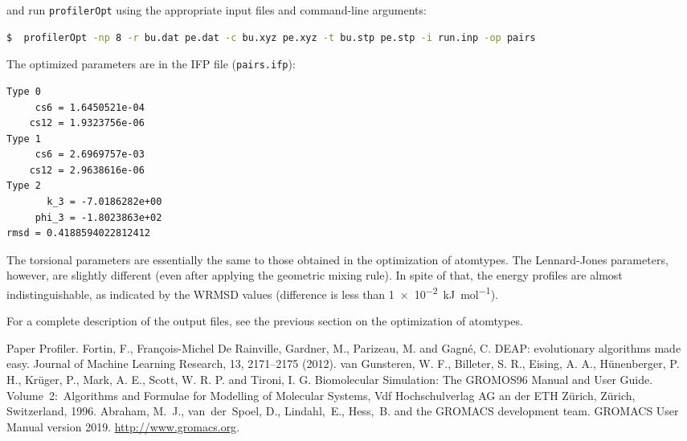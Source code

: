 \documentclass[10pt,a4paper,openany]{memoir}
\numberwithin{equation}{section}
\newcommand{\profileropt}[0]{\texttt{profilerOpt}}
\begin{document}
\noindent
and run \profileropt{} using the appropriate input files and 
command-line arguments:

\begin{lstlisting}[language=bash]
$  profilerOpt -np 8 -r bu.dat pe.dat -c bu.xyz pe.xyz -t bu.stp pe.stp -i run.inp -op pairs
\end{lstlisting}\vspace{2ex}\par

The optimized parameters are in the IFP file (\texttt{pairs.ifp}):

\begin{lstlisting}[language=gromacs]
Type 0
     cs6 = 1.6450521e-04     
    cs12 = 1.9323756e-06     
Type 1
     cs6 = 2.6969757e-03     
    cs12 = 2.9638616e-06     
Type 2
       k_3 = -7.0186282e+00    
     phi_3 = -1.8023863e+02    
rmsd = 0.4188594022812412
\end{lstlisting}\vspace{2ex}\par

\noindent
The torsional parameters are essentially the same to those obtained in
the optimization of atomtypes.  The Lennard-Jones parameters, however,
are slightly different (even after applying the geometric mixing
rule). In spite of that, the energy profiles are almost
indistinguishable, as indicated by the WRMSD values (difference is
less than \SI{1e-2}{\kJ\per\mole}).

For a complete description of the output files, see the previous section on the
optimization of atomtypes.

\begin{thebibliography}{9}
 Paper Profiler.
    Fortin, F., Fran\c{c}ois-Michel De Rainville, Gardner, M., Parizeau, M. and Gagn\'e, C. DEAP: evolutionary algorithms made easy. Journal of Machine Learning Research, 13, 2171–2175 (2012). 
 van Gunsteren, W. F., Billeter, S. R., Eising,
  A. A., Hünenberger, P. H., Krüger, P., Mark, A. E., Scott,
  W. R. P. and Tironi, I. G. Biomolecular Simulation: The GROMOS96
  Manual and User Guide. Volume~2:~Algorithms and Formulae for
  Modelling of Molecular Systems, Vdf Hochschulverlag AG an der ETH
  Zürich, Zürich, Switzerland, 1996.
 Abraham, M.~J., van~der~Spoel, D., Lindahl,~E.,
  Hess,~B. and the GROMACS development team. GROMACS User Manual
  version 2019. \url{http://www.gromacs.org}.
\end{thebibliography}
\end{document}
